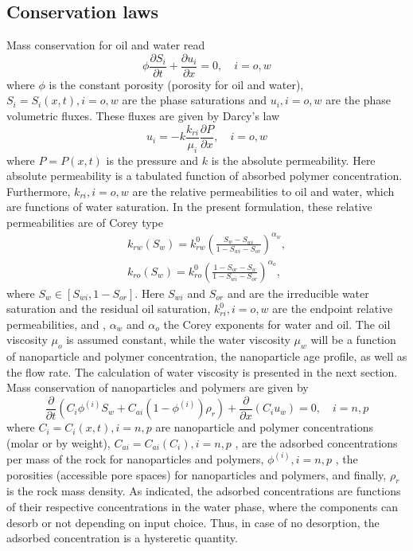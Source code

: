\documentclass[nanomaterials,article,submit,moreauthors,pdftex]{Definitions/mdpi}
\begin{document}
\subsection{Conservation laws}
Mass conservation for oil and water read
\begin{equation} \label{eq:massConservation} %
    \phi\frac{\partial S_i}{\partial t}+\frac{\partial u_i}{\partial x} = 0,\quad i = o, w
\end{equation}
where $\phi$ is the constant porosity (porosity for oil and water), $S_i=S_i(x,t), i = o,w$ are the phase saturations and $u_i, i=o,w$ are the phase volumetric fluxes. These fluxes are given by Darcy’s law
\begin{equation} \label{eq:fluxes} %
    u_i= -k\frac{k_{ri}}{\mu_i}\frac{\partial P}{\partial x},\quad i = o, w
\end{equation}
where $P=P(x,t)$  is the pressure and $k$ is the absolute permeability. Here absolute permeability is a tabulated function of absorbed polymer concentration. Furthermore, $k_{ri}, i = o, w$ are the relative permeabilities to oil and water, which are functions of water saturation. In the present formulation, these relative permeabilities are of Corey type
\begin{subequations}
\begin{eqnarray}
 k_{rw}(S_w)=k^0_{rw}(\frac{S_w-S_{wi}}{1-S_{wi}-S_{or}})^{\alpha_w} ,\\
    k_{ro}(S_w)=k^0_{ro}(\frac{1-S_{or}-S_{w}}{1-S_{wi}-S_{or}})^{\alpha_o} ,
\end{eqnarray}
\end{subequations}
where $S_w\in [S_{wi}, 1-S_{or}]$. Here $S_{wi}$ and $S_{or}$ and are the irreducible water saturation and the residual oil saturation, $k^0_{ri}, i=o,w$  are the endpoint relative permeabilities, and , $\alpha_w$ and $\alpha_o$  the Corey exponents for water and oil. The oil viscosity $\mu_o$ is assumed constant, while the water viscosity $\mu_w$ will be a function of nanoparticle and polymer concentration, the nanoparticle age profile, as well as the flow rate. The calculation of water viscosity is presented in the next section.
Mass conservation of nanoparticles and polymers are given by 
\begin{equation} \label{eq:massConsNPpol} %
    \frac{\partial}{\partial t}(C_i\phi^{(i)}S_w + C_{ai}(1-\phi^{(i)})\rho_r)+ \frac{\partial}{\partial x}(C_i u_w) = 0, \quad i = n, p
\end{equation}
where $C_i=C_i(x,t), i=n,p$ are nanoparticle and polymer concentrations (molar or by weight), $C_{ai}=C_{ai}(C_i), i=n,p$ , are the adsorbed concentrations per mass of the rock for nanoparticles and polymers, $\phi^{(i)}, i=n,p$ , the porosities (accessible pore spaces) for nanoparticles and polymers, and finally, $\rho_r$ is the rock mass density. As indicated, the adsorbed concentrations are functions of their respective concentrations in the water phase, where the components can desorb or not depending on input choice. Thus, in case of no desorption, the adsorbed concentration is a hysteretic quantity.   
\end{document}
